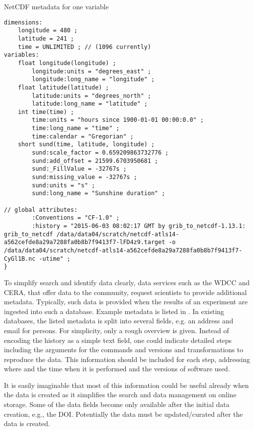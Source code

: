 \begin{tcbcode}[label={lst:NetCDF-data-map}]{NetCDF metadata for one variable}
\begin{lstlisting}
dimensions:
	longitude = 480 ;
	latitude = 241 ;
	time = UNLIMITED ; // (1096 currently)
variables:
	float longitude(longitude) ;
		longitude:units = "degrees_east" ;
		longitude:long_name = "longitude" ;
	float latitude(latitude) ;
		latitude:units = "degrees_north" ;
		latitude:long_name = "latitude" ;
	int time(time) ;
		time:units = "hours since 1900-01-01 00:00:0.0" ;
		time:long_name = "time" ;
		time:calendar = "Gregorian" ;
	short sund(time, latitude, longitude) ;
		sund:scale_factor = 0.659209863732776 ;
		sund:add_offset = 21599.6703950681 ;
		sund:_FillValue = -32767s ;
		sund:missing_value = -32767s ;
		sund:units = "s" ;
		sund:long_name = "Sunshine duration" ;

// global attributes:
		:Conventions = "CF-1.0" ;
		:history = "2015-06-03 08:02:17 GMT by grib_to_netcdf-1.13.1: grib_to_netcdf /data/data04/scratch/netcdf-atls14-a562cefde8a29a7288fa0b8b7f9413f7-lFD4z9.target -o /data/data04/scratch/netcdf-atls14-a562cefde8a29a7288fa0b8b7f9413f7-CyGl1B.nc -utime" ;
}
\end{lstlisting}
\end{tcbcode}

To simplify search and identify data clearly, data services such as the WDCC and CERA, that offer data to the community, request scientists to provide additional metadata.
Typically, such data is provided when the results of an experiment are ingested into such a database.
Example metadata is listed in .
In existing databases, the listed metadata is split into several fields, e.g. an address and email for persons. For simplicity, only a rough overview is given.
Instead of encoding the history as a simple text field, one could
indicate detailed steps including the arguments for the commands and versions and transformations to reproduce the data.
This information should be included for each step, addressing where and the time when it is performed and the versions of software used.

It is easily imaginable that most of this information could be useful already when the data is created as it simplifies the search and data management on online storage.
Some of the data fields become only available after the initial data creation, e.g., the DOI.
Potentially the data must be updated/curated after the data is created.

